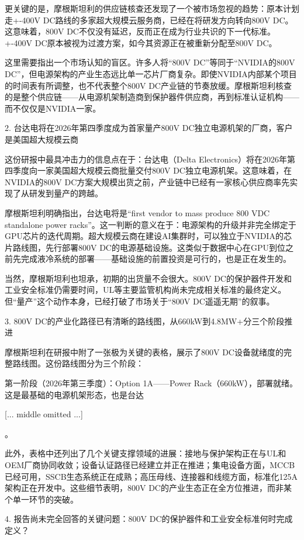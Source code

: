\documentclass[11pt]{ctexart}
\begin{document}
更关键的是，摩根斯坦利的供应链核查还发现了一个被市场忽视的趋势：原本计划走+-400V DC路线的多家超大规模云服务商，已经在将研发方向转向800V DC。这意味着，800V DC不仅没有延迟，反而正在成为行业共识的下一代标准。+-400V DC原本被视为过渡方案，如今其资源正在被重新分配至800V DC。

这里需要指出一个市场认知的盲区。许多人将“800V DC”等同于“NVIDIA的800V DC”，但电源架构的产业生态远比单一芯片厂商复杂。即使NVIDIA内部某个项目的时间表有所调整，也不代表整个800V DC产业链的节奏放缓。摩根斯坦利核查的是整个供应链——从电源机架制造商到保护器件供应商，再到标准认证机构——而不仅仅是NVIDIA一家。

2. 台达电将在2026年第四季度成为首家量产800V DC独立电源机架的厂商，客户是美国超大规模云商

这份研报中最具冲击力的信息点在于：台达电（Delta Electronics）将在2026年第四季度向一家美国超大规模云商批量交付800V DC独立电源机架。这意味着，在NVIDIA的800V DC方案大规模出货之前，产业链中已经有一家核心供应商率先实现了从研发到量产的跨越。

摩根斯坦利明确指出，台达电将是“first vendor to mass produce 800 VDC standalone power racks”。这一判断的意义在于：电源架构的升级并非完全绑定于GPU芯片的迭代周期。超大规模云商在建设AI集群时，可以独立于NVIDIA的芯片路线图，先行部署800V DC的电源基础设施。这类似于数据中心在GPU到位之前先完成液冷系统的部署——基础设施的前置投资是可行的，也是正在发生的。

当然，摩根斯坦利也坦承，初期的出货量不会很大。800V DC的保护器件开发和工业安全标准仍需要时间，UL等主要监管机构尚未完成相关标准的最终定义。但“量产”这个动作本身，已经打破了市场关于“800V DC遥遥无期”的叙事。

3. 800V DC的产业化路径已有清晰的路线图，从660kW到4.8MW+分三个阶段推进

摩根斯坦利在研报中附了一张极为关键的表格，展示了800V DC设备就绪度的完整路线图。这份路线图分为三个阶段：

第一阶段（2026年第三季度）：Option 1A——Power Rack（660kW），部署就绪。这是最基础的电源机架形态，也是台达

[... middle omitted ...]

。

此外，表格中还列出了几个关键支撑领域的进展：接地与保护架构正在与UL和OEM厂商协同收敛；设备认证路径已经建立并正在推进；集电设备方面，MCCB已经可用，SSCB生态系统正在成熟；高压母线、连接器和线缆方面，标准化125A架构正在开发中。这些细节表明，800V DC的产业生态正在全方位推进，而非某个单一环节的突破。

4. 报告尚未完全回答的关键问题：800V DC的保护器件和工业安全标准何时完成定义？
\end{document}

